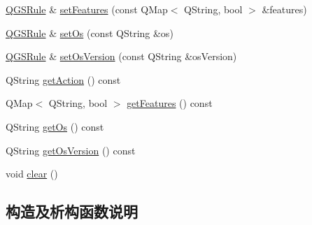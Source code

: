 \begin{DoxyCompactItemize}
\item 
\mbox{\hyperlink{class_q_g_s_rules_1_1_q_g_s_rule}{Q\+G\+S\+Rule}} \& \mbox{\hyperlink{class_q_g_s_rules_1_1_q_g_s_rule_a564c8527377989889481041592d00464}{set\+Features}} (const Q\+Map$<$ Q\+String, bool $>$ \&features)
\item 
\mbox{\hyperlink{class_q_g_s_rules_1_1_q_g_s_rule}{Q\+G\+S\+Rule}} \& \mbox{\hyperlink{class_q_g_s_rules_1_1_q_g_s_rule_a8bf96924c42285d470980d82e2eed17a}{set\+Os}} (const Q\+String \&os)
\item 
\mbox{\hyperlink{class_q_g_s_rules_1_1_q_g_s_rule}{Q\+G\+S\+Rule}} \& \mbox{\hyperlink{class_q_g_s_rules_1_1_q_g_s_rule_ac91e028168c81ea0b884a13b86561af4}{set\+Os\+Version}} (const Q\+String \&os\+Version)
\item 
Q\+String \mbox{\hyperlink{class_q_g_s_rules_1_1_q_g_s_rule_ab0965dd8646414ed2f0a1ff588035512}{get\+Action}} () const
\item 
Q\+Map$<$ Q\+String, bool $>$ \mbox{\hyperlink{class_q_g_s_rules_1_1_q_g_s_rule_afbc9a63ea07709ecd357a044fd383d4a}{get\+Features}} () const
\item 
Q\+String \mbox{\hyperlink{class_q_g_s_rules_1_1_q_g_s_rule_a475d20952aae6d30bc7e6d59f20964fc}{get\+Os}} () const
\item 
Q\+String \mbox{\hyperlink{class_q_g_s_rules_1_1_q_g_s_rule_adad13e7a6a0f76d9583663c72a9952a5}{get\+Os\+Version}} () const
\item 
void \mbox{\hyperlink{class_q_g_s_rules_1_1_q_g_s_rule_a6aa035ca47573cf7ba8562e711f6877e}{clear}} ()
\end{DoxyCompactItemize}


\subsection{构造及析构函数说明}
\mbox{\label{class_q_g_s_rules_1_1_q_g_s_rule_a4388fb023e874f4401997c5c2f46ee2e}} 
